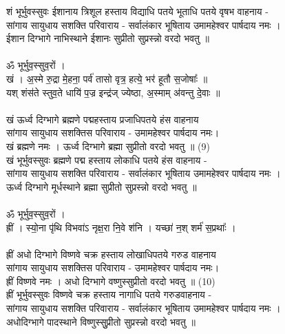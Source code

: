 {\small शं भूर्भुवस्सुवः ईशानाय त्रिशूल हस्ताय विद्याधि पतये भूताधि पतये वृषभ वाहनाय -\\
सांगाय सायुधाय सशक्ति परिवाराय - सर्वालंकार भूषिताय उमामहेश्वर पार्षदाय नमः ।\\
ईशान दिग्भागे नाभिस्थाने ईशानः सुप्रीतो सुप्रस्न्नो वरदो भवतु ॥}\\
\\
ॐ भूर्भुव॒स्सुव॒रों ।\\
खं । अ॒स्मे रु॒द्रा मे॒हना॒ पर्व॑ तासो वृत्र॒ हत्ये॒ भर॑ हूतौ स॒जोषाः᳚ ॥\\
यश् शंस॑ते स्तुव॒ते धायि॑ प॒ज्र इन्द्र॑ज् ज्येष्ठा, अ॒स्माम् अ॑वन्तु दे॒वाः ॥\\
\\
खं ऊर्ध्व दिग्भागे ब्रह्मणे पद्महस्ताय प्रजाधिपतये हंस वाहनाय\\
सांगाय सायुधाय सशक्तिस परिवाराय -  उमामहेश्वर पार्षदाय नमः।\\
खं ब्रह्मणे नमः । ऊर्ध्व दिग्भागे ब्रह्मा सुप्रीतो  वरदो भवतु ॥  (9)\\
{\small खं भूर्भुवस्सुवः ब्रह्मणे पद्म हस्ताय लोकाधि पतये हंस वाहनाय -\\
सांगाय सायुधाय सशक्ति परिवाराय - सर्वालंकार भूषिताय उमामहेश्वर पार्षदाय नमः ।\\
ऊर्ध्व दिग्भागे मूर्धस्थाने ब्रह्मा सुप्रीतो सुप्रस्न्नो वरदो भवतु ॥}\\
\\
ॐ भूर्भुव॒स्सुव॒रों ।\\
ह्रीं । स्यो॒ना पृ॑थि विभवा॑ऽ नृक्ष॒रा नि॒वे श॑नि । यच्छा॑ न॒श् शर्म॑ स॒प्रथाः᳚ ।\\
\\
ह्रीं अधो दिग्भागे विष्णवे चक्र हस्ताय लोखाधिपतये गरुड वाहनाय\\
सांगाय सायुधाय सशक्तिस परिवाराय -  उमामहेश्वर पार्षदाय नमः।\\
ह्रीं विष्णवे नमः । अधो दिग्भागे वष्णुस्सुप्रीतो वरदो भवतु ॥  (10)\\
{\small ह्रीं भूर्भुवस्सुवः विष्णवे चक्र हस्ताय नागाधि पतये गरुडवाहनाय -\\
सांगाय सायुधाय सशक्ति परिवाराय - सर्वालंकार भूषिताय उमामहेश्वर पार्षदाय नमः ।\\
अधोदिग्भागे पादस्थाने विष्णुस्सुुप्रीतो सुप्रस्न्नो वरदो भवतु ॥}\\
